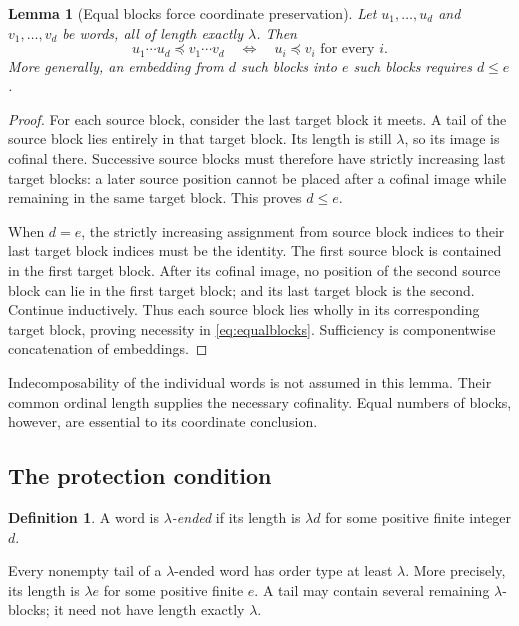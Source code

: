 \documentclass[11pt,letterpaper]{article}
\newtheorem{lemma}[lemma]{Lemma}
\theoremstyle{definition}
\newtheorem{definition}[definition]{Definition}
\theoremstyle{remark}
\newcommand{\emb}{\preccurlyeq}
\begin{document}
\begin{lemma}[Equal blocks force coordinate preservation]\label{lem:equalblocks}
Let $u_1,\ldots,u_d$ and $v_1,\ldots,v_d$ be words, all of length exactly
$\lambda$. Then
\begin{equation}\label{eq:equalblocks}
  u_1\cdots u_d\emb v_1\cdots v_d
  \quad\Longleftrightarrow\quad
  u_i\emb v_i\text{ for every }i.
\end{equation}
More generally, an embedding from $d$ such blocks into $e$ such blocks
requires $d\le e$.
\end{lemma}

\begin{proof}
For each source block, consider the last target block it meets. A tail of
the source block lies entirely in that target block. Its length is still
$\lambda$, so its image is cofinal there. Successive source blocks must
therefore have strictly increasing last target blocks: a later source
position cannot be placed after a cofinal image while remaining in the
same target block. This proves $d\le e$.

When $d=e$, the strictly increasing assignment from source block indices
to their last target block indices must be the identity. The first source
block is contained in the first target block. After its cofinal image,
no position of the second source block can lie in the first target block;
and its last target block is the second. Continue inductively. Thus each
source block lies wholly in its corresponding target block, proving
necessity in \eqref{eq:equalblocks}. Sufficiency is componentwise
concatenation of embeddings.
\end{proof}

Indecomposability of the individual words is not assumed in this lemma.
Their common ordinal length supplies the necessary cofinality.
Equal numbers of blocks, however, are essential to its coordinate conclusion.

\subsection{The protection condition}

\begin{definition}
A word is \emph{$\lambda$-ended} if its length is $\lambda d$ for some
positive finite integer $d$.
\end{definition}

Every nonempty tail of a $\lambda$-ended word has order type at least
$\lambda$. More precisely, its length is $\lambda e$ for some positive
finite $e$. A tail may contain several remaining $\lambda$-blocks; it
need not have length exactly $\lambda$.
\end{document}
